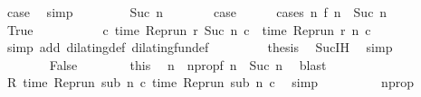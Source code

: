 \begin{isabellebody}
\ {\isacharquery}case\ \isamarkupfalse%
\ simp\isanewline
\ \ \isamarkupfalse%
\isanewline
\ \ \ \ \isamarkupfalse%
\ {\isacharparenleft}Suc\ n{\isacharparenright}\isanewline
\ \ \ \ \isamarkupfalse%
\ \isamarkupfalse%
\ {\isacharquery}case\isanewline
\ \ \ \ \isamarkupfalse%
\ {\isacharparenleft}cases\ {\isacartoucheopen}{\isasymnexists}n\ f\ n\ {\isacharequal}\ Suc\ n{\isacartoucheclose}{\isacharparenright}\isanewline
\ \ \ \ \ \ \isamarkupfalse%
\ True\isanewline
\ \ \ \ \ \ \isamarkupfalse%
\ {\isacharasterisk}\ \isamarkupfalse%
\ {\isacartoucheopen}{\isasymforall}c{\isachardot}\ time\ {\isacharparenleft}Rep{\isacharunderscore}run\ r\ {\isacharparenleft}Suc\ n{\isacharparenright}\ c{\isacharparenright}\ {\isacharequal}\ time\ {\isacharparenleft}Rep{\isacharunderscore}run\ r\ n\ c{\isacharparenright}{\isacartoucheclose}\isanewline
\ \ \ \ \ \ \ \ \isamarkupfalse%
\ {\isacharparenleft}simp\ add{\isacharcolon}\ dilating{\isacharunderscore}def\ dilating{\isacharunderscore}fun{\isacharunderscore}def{\isacharparenright}\ \isanewline
\ \ \ \ \ \ \isamarkupfalse%
\ {\isacharquery}thesis\ \isamarkupfalse%
\ Suc{\isachardot}IH\ \isamarkupfalse%
\ simp\isanewline
\ \ \ \ \isamarkupfalse%
\isanewline
\ \ \ \ \ \ \isamarkupfalse%
\ False\isanewline
\ \ \ \ \ \ \isamarkupfalse%
\ this\ \isamarkupfalse%
\ n\ \ nprop{\isacharcolon}{\isacartoucheopen}f\ n\ {\isacharequal}\ Suc\ n{\isacartoucheclose}\ \isamarkupfalse%
\ blast\isanewline
\ \ \ \ \ \ \isamarkupfalse%
\ {}\ \isamarkupfalse%
\ {\isacartoucheopen}R\ {\isacharparenleft}time\ {\isacharparenleft}{\isacharparenleft}Rep{\isacharunderscore}run\ sub{\isacharparenright}\ n\ c\ time\ {\isacharparenleft}{\isacharparenleft}Rep{\isacharunderscore}run\ sub{\isacharparenright}\ n\ c\ \isamarkupfalse%
\ simp\isanewline
\ \ \ \ \ \ \isamarkupfalse%
\ \isamarkupfalse%
\ nprop\ {\isacharasterisk}\ \isamarkupfalse%

\end{isabellebody}
